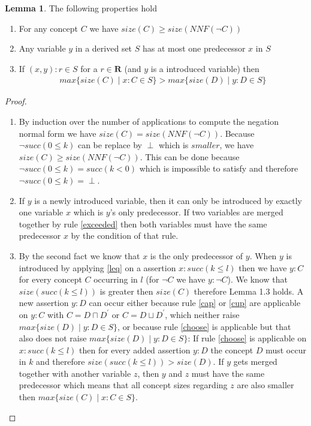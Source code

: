 \documentclass[a4paper,11pt]{scrartcl}
\theoremstyle{break}
\theoremstyle{definition}
\newtheorem{mylem}{Lemma}
\begin{document}
\begin{mylem}
The following properties hold
\begin{enumerate}
\item For any concept $C$ we have $size(C)\geq size(NNF(\neg C))$
 \item Any variable $y$ in a derived set $S$ has at most one predecessor $x$ in $S$
\item If $(x,y):r\in S$ for a $r\in\mathbf{R}$ (and $y$ is a introduced variable) then 
\begin{align*}
max\{size(C)\mid x:C\in S\}>max\{size(D)\mid y:D \in S\}
\end{align*}
\end{enumerate}
\end{mylem}
\begin{proof}$ $\\
\vspace*{-5mm}
\begin{enumerate}
\item By induction over the number of applications to compute the negation normal form we have $size(C)=size(NNF(\neg C))$. Because $\neg succ(0\leq k)$ can be replace by $\perp$ which is $smaller$, we have $size(C)\geq size(NNF(\neg C))$. This can be done because $\neg succ(0\leq k)= succ(k<0)$ which is impossible to satisfy and therefore $\neg succ(0\leq k)=\perp$.
\item If $y$ is a newly introduced variable, then it can only be introduced by exactly one variable $x$ which is $y$'s only predecessor. If two variables are merged together by rule \ref{exceeded} then both variables must have the same predecessor $x$ by the condition of that rule.
\item By the second fact we know that $x$ is the only predecessor of $y$. When $y$ is introduced by applying \ref{leq} on a assertion $x:succ(k\leq l)$ then we have $y:C$ for every concept $C$ occurring in $l$ (for $\neg C$ we have $y:\neg C$). We know that $size(succ(k\leq l))$ is greater then $size(C)$ therefore Lemma 1.3 holds. A new assertion $y:D$ can occur either because rule \ref{cap} or \ref{cup} are applicable on $y:C$ with $C=D\sqcap D^\prime$ or $C=D\sqcup D^\prime$, which neither raise $max\{size(D)\mid y:D \in S\}$, or because rule \ref{choose} is applicable but that also does not raise $max\{size(D)\mid y:D \in S\}$: If rule \ref{choose} is applicable on $x:succ(k\leq l)$ then for every added assertion $y:D$ the concept $D$ must occur in $k$ and therefore $size(succ(k\leq l))>size(D)$. If $y$ gets merged together with another variable $z$, then $y$ and $z$ must have the same predecessor which means that all concept sizes regarding $z$ are also smaller then $max\{size(C)\mid x:C\in S\}$. 
\end{enumerate}
\end{proof}
\end{document}
